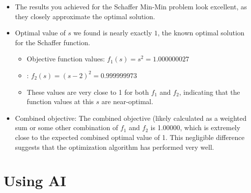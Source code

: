 \documentclass[
  letterpaper,
  DIV=11,
  numbers=noendperiod]{scrreprt}
\providecommand{\tightlist}{%
  \setlength{\itemsep}{0pt}\setlength{\parskip}{0pt}}\usepackage{longtable,booktabs,array}
\begin{document}
\begin{itemize}
\tightlist
\item
  The results you achieved for the Schaffer Min-Min problem look
  excellent, as they closely approximate the optimal solution.
\item
  Optimal value of \(s\) we found is nearly exactly \(1\), the known
  optimal solution for the Schaffer function.

  \begin{itemize}
  \tightlist
  \item
    Objective function values: \(f_1(s) = s^2 = 1.000000027\)
  \item
    : \(f_2(s) = (s-2)^2 = 0.999999973\)
  \item
    These values are very close to 1 for both \(f_1\) and \(f_2\),
    indicating that the function values at this \(s\) are near-optimal.
  \end{itemize}
\item
  Combined objective: The combined objective (likely calculated as a
  weighted sum or some other combination of \(f_1\) and \(f_2\) is
  1.00000, which is extremely close to the expected combined optimal
  value of 1. This negligible difference suggests that the optimization
  algorithm has performed very well.
\end{itemize}


\chapter{Using AI}\label{using-ai-3}
\end{document}
